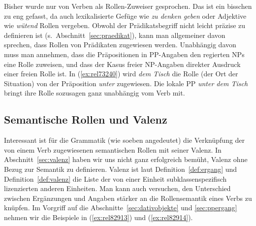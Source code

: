 Bisher wurde nur von Verben als Rollen-Zuweiser gesprochen.
Das ist ein bisschen zu eng gefasst, da auch lexikalisierte Gefüge wie \textit{zu denken geben} oder Adjektive wie \textit{wütend} Rollen vergeben.
Obwohl der Prädikatsbegriff nicht leicht präzise zu definieren ist (s.\ Abschnitt~\ref{sec:praedikat}), kann man allgemeiner davon sprechen, dass Rollen von Prädikaten zugewiesen werden.
Unabhängig davon muss man annehmen, dass die Präpositionen in PP-Angaben den regierten NPs eine Rolle zuweisen, und dass der Kasus freier NP-Angaben direkter Ausdruck einer freien Rolle ist.
In (\ref{ex:rel73240}) wird \textit{dem Tisch} die Rolle (der Ort der Situation) von der Präposition \textit{unter} zugewiesen.
Die lokale PP \textit{unter dem Tisch} bringt ihre Rolle sozusagen ganz unabhängig vom Verb mit.

\begin{exe}
\end{exe}

\subsection{Semantische Rollen und Valenz}


Interessant ist für die Grammatik (wie soeben angedeutet) die Verknüpfung der von einem Verb zugewiesenen semantischen Rollen mit seiner Valenz.
In Abschnitt~\ref{sec:valenz} haben wir uns nicht ganz erfolgreich bemüht, Valenz ohne Bezug zur Semantik zu definieren.
Valenz ist laut Definition~\ref{def:ergang} und Definition~\ref{def:valenz} die Liste der von einer Einheit subklassenspezifisch lizenzierten anderen Einheiten.
Man kann auch versuchen, den Unterschied zwischen Ergänzungen und Angaben stärker an die Rollensemantik eines Verbs zu knüpfen.
Im Vorgriff auf die Abschnitte~\ref{sec:dativobjekte} und \ref{sec:ppergang} nehmen wir die Beispiele in (\ref{ex:rel82913}) und (\ref{ex:rel82914}).

\begin{exe}
  \ex\label{ex:rel82913} 
  \begin{xlist}
  \end{xlist}
  \ex\label{ex:rel82914} 
  \begin{xlist}
  \end{xlist}
\end{exe}


